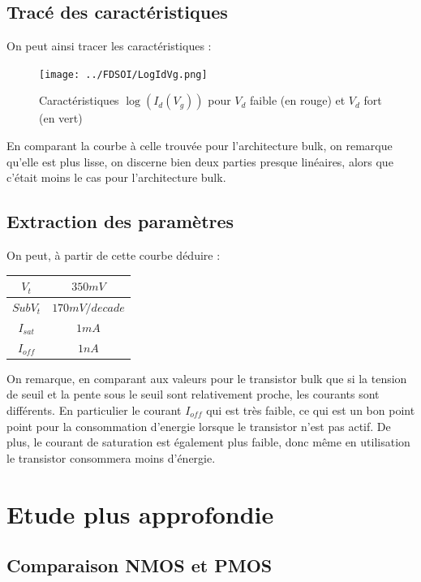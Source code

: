 \documentclass[a4paper,11pt]{report}
\begin{document}
\section{Tracé des caractéristiques}

On peut ainsi tracer les caractéristiques :

\begin{figure}[H]
    \centering
    \texttt{[image: ../FDSOI/LogIdVg.png]}
    \caption{Caractéristiques $\log(I_d(V_g))$ pour $V_d$ faible (en rouge) et $V_d$ fort (en vert)}    
\end{figure}

En comparant la courbe à celle trouvée pour l'architecture bulk, on remarque qu'elle est plus lisse, on discerne bien deux parties presque linéaires, alors que c'était moins le cas pour l'architecture bulk.

\section{Extraction des paramètres}

On peut, à partir de cette courbe déduire : 

\begin{tableau}[H]
\centering
\begin{tabular}{|c|c|}
\hline
$V_t$&$350mV$\\
\hline
$SubV_t$&$170mV/decade$\\
\hline
$I_{sat}$&$1mA$\\
\hline
$I_{off}$&$1 nA$\\
\hline
\end{tabular}
\caption{Caractéristiques du FDSOI avec $V_{ds}=1V$}
\end{tableau}

On remarque, en comparant aux valeurs pour le transistor bulk que si la tension de seuil et la pente sous le seuil sont relativement proche, les courants sont différents. En particulier le courant $I_{off}$ qui est très faible, ce qui est un bon point point pour la consommation d'energie lorsque le transistor n'est pas actif. De plus, le courant de saturation est également plus faible, donc même en utilisation le transistor consommera moins d'énergie.

\chapter{Etude plus approfondie}

\section{Comparaison NMOS et PMOS}
\end{document}
